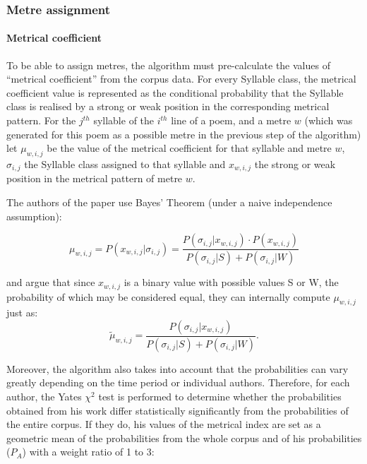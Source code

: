 \subsubsection{Metre assignment}
\paragraph{Metrical coefficient}
To be able to assign metres, the algorithm must pre-calculate the values of \enquote{metrical coefficient} from the corpus data. For every Syllable class, the metrical coefficient value is represented as the conditional probability that the Syllable class is realised by a strong or weak position in the corresponding metrical pattern. For the $j^{th}$ syllable of the $i^{th}$ line of a poem, and a metre $w$ (which was generated for this poem as a possible metre in the previous step of the algorithm) let $\mu_{w,i,j}$ be the value of the metrical coefficient for that syllable and metre $w$, $\sigma_{i,j}$ the Syllable class assigned to that syllable and $x_{w,i,j}$ the strong or weak position in the metrical pattern of metre $w$.

The authors of the paper use Bayes' Theorem (under a naive independence assumption):

\begin{equation}
    \mu_{w,i,j} = P(x_{w,i,j}|\sigma_{i,j}) = \frac{P(\sigma_{i,j}|x_{w,i,j})\cdot P(x_{w,i,j})}{P(\sigma_{i,j}|S) + P(\sigma_{i,j}|W)}
\end{equation}

and argue that since $x_{w,i,j}$ is a binary value with possible values S or W, the probability of which may be considered equal, they can internally compute $\mu_{w,i,j}$ just as:
\begin{equation}\label{eq:kveta-data-driven-0}
    \tilde{\mu}_{w,i,j} = \frac{P(\sigma_{i,j}|x_{w,i,j})}{P(\sigma_{i,j}|S) + P(\sigma_{i,j}|W)}.
\end{equation}

Moreover, the algorithm also takes into account that the probabilities can vary greatly depending on the time period or individual authors. Therefore, for each author, the Yates $\chi^2$ test is performed to determine whether the probabilities obtained from his work differ statistically significantly from the probabilities of the entire corpus. If they do, his values of the metrical index are set as a geometric mean of the probabilities from the whole corpus and of his probabilities ($P_A$) with a weight ratio of 1 to 3:

